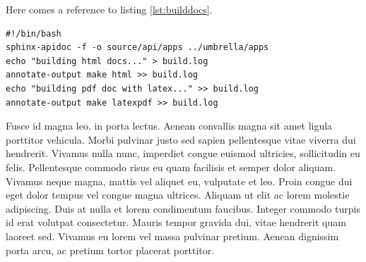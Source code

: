\begin{figure}[H]
\begin{center}
	\label{fig:api_render_to_file}
\end{center}
\end{figure}

Here comes a reference to listing \ref{lst:builddocs}.

\lstset{tabsize=2,language=bash}
\begin{lstlisting}[breaklines=true,frame=single,caption={Shellscript for building the software documentation in HTML and PDF},label=lst:builddocs]
#!/bin/bash
sphinx-apidoc -f -o source/api/apps ../umbrella/apps
echo "building html docs..." > build.log
annotate-output make html >> build.log
echo "building pdf doc with latex..." >> build.log
annotate-output make latexpdf >> build.log
\end{lstlisting}

Fusce id magna leo, in porta lectus. Aenean convallis magna sit amet ligula
porttitor vehicula. Morbi pulvinar justo sed sapien pellentesque vitae viverra
dui hendrerit. Vivamus nulla nunc, imperdiet congue euismod ultricies,
sollicitudin eu felis. Pellentesque commodo risus eu quam facilisis et semper
dolor aliquam. Vivamus neque magna, mattis vel aliquet eu, vulputate et leo.
Proin congue dui eget dolor tempus vel congue magna ultrices. Aliquam ut elit
ac lorem molestie adipiscing. Duis at nulla et lorem condimentum faucibus.
Integer commodo turpis id erat volutpat consectetur. Mauris tempor gravida
dui, vitae hendrerit quam laoreet sed. Vivamus eu lorem vel massa pulvinar
pretium. Aenean dignissim porta arcu, ac pretium tortor placerat porttitor. 


